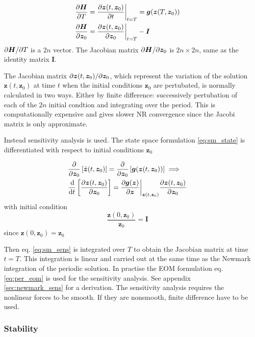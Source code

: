 \begin{align}
  \label{eq:sm_jac1}
  \frac{\partial \bm H}{\partial T} &=
  \frac{\partial \bm z(t, \bm z_0)}{\partial t}\bigg|_{t=T} =
  \bm g(\bm z(T, \bm z_0)) \\
  \frac{\partial \bm H}{\partial \bm z_{0}} &=
  \frac{\partial \bm z(t, \bm z_0)}{\partial \bm z_0}\bigg|_{t=T} - \bm I
  \label{eq:sm_jac2}
\end{align}
$\partial \bm H / \partial T$ is a $2n$ vector. The Jacobian matrix $\partial \bm H / \partial \bm
z_{0}$ is $2n\times 2n$, same as the identity matrix $\bm I$.

The Jacobian matrix $\partial \bm z(t,\bm z_0) / \partial \bm z_{0}$, which represent the
variation of the solution $\bm z(t,\bm z_0)$ at time $t$ when the initial
conditions $\bm z_0$ are pertubated, is normally calculated in two ways. Either
by finite difference: successively pertubation of each of the $2n$ initial
condtion and integrating over the period. This is computationally expensive and
gives slower NR convergence since the Jacobi matrix is only approximate.

Instead sensitivity analysis is used. The state space formulation
\eqref{eq:sm_state} is differentiated with respect to initial conditions $\bm
z_0$

\begin{align}
  &\frac{\partial}{\partial \bm z_0} \left[ \dot{\bm z}(t, \bm z_0) \right] =
    \frac{\partial}{\partial \bm z_0} \left[ \bm g(\bm z(t, \bm z_0)) \right] \implies
    \\
  &\frac{\operatorname{d}\!}{\operatorname{d}\! t} \left[  \frac{\partial \bm z(t, \bm z_0)}{\partial \bm z_0} \right] =
    \frac{\partial \bm g(\bm z)}{\partial \bm z}\bigg|_{\bm z(t,\bm z_0)}
    \frac{\partial \bm z(t, \bm z_0)}{\partial \bm z_0}
    \label{eq:sm_sens}
\end{align}
with initial condition
\begin{equation}
  \label{eq:sm_sens_init}
  \frac{\bm z(0,\bm z_0)}{\bm z_0} = \bm I
\end{equation}
since $\bm z(0,\bm z_0) = \bm z_0$

Then eq. \eqref{eq:sm_sens} is integrated over $T$ to obtain the Jacobian matrix
at time $t=T$. This integration is linear and carried out at the same time as
the Newmark integration of the periodic solution. In practise the EOM
formulation eq. \eqref{eq:per_eom} is used for the sensitivity analysis. See
appendix \ref{sec:newmark_sens} for a derivation. The sensitivity analysis
requires the nonlinear forces to be smooth. If they are nonsmooth, finite
difference have to be used.

\subsubsection{Stability}
\label{sec:sm_stab}

